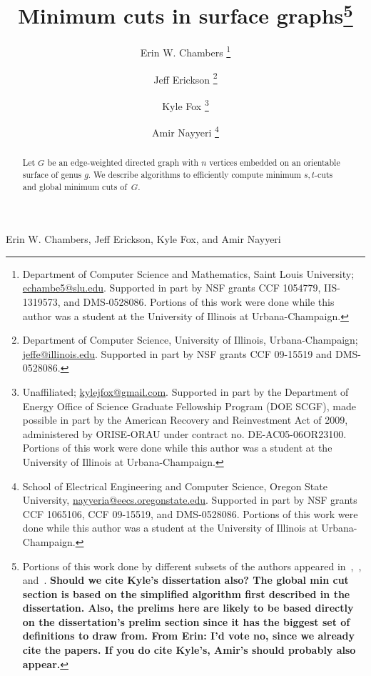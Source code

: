 \documentclass[11pt,twoside]{article}
\begin{document}
\pagestyle{myheadings}
		 {Erin W. Chambers, Jeff Erickson, Kyle Fox, and Amir Nayyeri}

\begin{titlepage}

\title{Minimum cuts in surface graphs\footnote{
Portions of this work done by different subsets of the authors appeared in~\cite{cen-mcshc-09},~\cite{en-mcsnc-11}, and~\cite{efn-gmcse-12}.
\textbf{\color{red} Should we cite Kyle's dissertation also?
The global min cut section is based on the simplified algorithm first described in the dissertation.
Also, the prelims here are likely to be based directly on the dissertation's prelim section since it has the biggest set of definitions to draw from.  From Erin: I'd vote no, since we already cite the papers.  If you do cite Kyle's, Amir's should probably also appear.}
}}

\author{
  Erin W. Chambers%
  \thanks{Department of Computer Science and Mathematics, Saint Louis
  University;
  \url{echambe5@slu.edu}.  Supported in part by NSF grants CCF 1054779, IIS-1319573, and DMS-0528086.
  Portions of this work were done while this author was a student at the University of Illinois at Urbana-Champaign.}
  \and
  Jeff Erickson%
  \thanks{Department of Computer Science,
  University of Illinois, Urbana-Champaign; \url{jeffe@illinois.edu}.
  Supported in part by NSF grants CCF 09-15519 and DMS-0528086.
  }
  \and
  Kyle Fox%
  \thanks{Unaffiliated; \url{kylejfox@gmail.com}.
  Supported in part by
      the Department of Energy Office
      of Science Graduate Fellowship Program (DOE SCGF),
      made possible in part by the American Recovery and
      Reinvestment Act of 2009, administered by ORISE-ORAU
      under contract no. DE-AC05-06OR23100.
      Portions of this work were done while this author was a student at the University of Illinois at Urbana-Champaign.}
  \and
  Amir Nayyeri%
  \thanks{School of Electrical Engineering and Computer Science,
      Oregon State University,
      \url{nayyeria@eecs.oregonstate.edu}. Supported in part by NSF grants
      CCF 1065106, CCF 09-15519, and DMS-0528086. Portions of this work were done while this author was a student 
      at the University of Illinois at Urbana-Champaign.}
      }

\DRAFT

\maketitle
\begin{abstract}
Let $G$ be an edge-weighted directed graph with $n$ vertices embedded on an orientable surface of genus $g$.
We describe algorithms to efficiently compute minimum $s,t$-cuts and global minimum cuts of~$G$.
\end{abstract}

\noindent

\thispagestyle{empty}
\setcounter{page}{0}
\end{titlepage}















\end{document}
